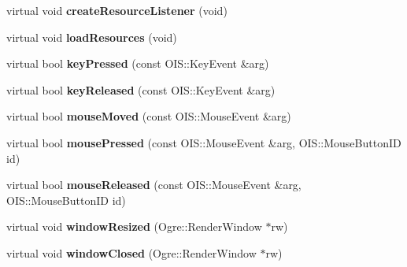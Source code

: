 \begin{DoxyCompactItemize}
\item 
\hypertarget{classBaseApplication_a9b77972f0f747a61e1f8ceba2ad47641}{virtual void {\bfseries create\-Resource\-Listener} (void)}\label{classBaseApplication_a9b77972f0f747a61e1f8ceba2ad47641}

\item 
\hypertarget{classBaseApplication_aaeb764e637dd87601a81a80156659d88}{virtual void {\bfseries load\-Resources} (void)}\label{classBaseApplication_aaeb764e637dd87601a81a80156659d88}

\item 
\hypertarget{classBaseApplication_acfa977f04e435f18018ece805c1277ec}{virtual bool {\bfseries key\-Pressed} (const O\-I\-S\-::\-Key\-Event \&arg)}\label{classBaseApplication_acfa977f04e435f18018ece805c1277ec}

\item 
\hypertarget{classBaseApplication_aba5c7c9dea7a0efc58b89310bae547e5}{virtual bool {\bfseries key\-Released} (const O\-I\-S\-::\-Key\-Event \&arg)}\label{classBaseApplication_aba5c7c9dea7a0efc58b89310bae547e5}

\item 
\hypertarget{classBaseApplication_a126e59cb246b061e51eb6ce06a2ee8f4}{virtual bool {\bfseries mouse\-Moved} (const O\-I\-S\-::\-Mouse\-Event \&arg)}\label{classBaseApplication_a126e59cb246b061e51eb6ce06a2ee8f4}

\item 
\hypertarget{classBaseApplication_a9255dfc1eabefd11c474ec45a6622504}{virtual bool {\bfseries mouse\-Pressed} (const O\-I\-S\-::\-Mouse\-Event \&arg, O\-I\-S\-::\-Mouse\-Button\-I\-D id)}\label{classBaseApplication_a9255dfc1eabefd11c474ec45a6622504}

\item 
\hypertarget{classBaseApplication_aa102c5859c14c0690c749994a446b53d}{virtual bool {\bfseries mouse\-Released} (const O\-I\-S\-::\-Mouse\-Event \&arg, O\-I\-S\-::\-Mouse\-Button\-I\-D id)}\label{classBaseApplication_aa102c5859c14c0690c749994a446b53d}

\item 
\hypertarget{classBaseApplication_afacf8a797588592ef0abbad593f10cfa}{virtual void {\bfseries window\-Resized} (Ogre\-::\-Render\-Window $\ast$rw)}\label{classBaseApplication_afacf8a797588592ef0abbad593f10cfa}

\item 
\hypertarget{classBaseApplication_ae0e37ac54a31ff6e51d58c7654ad1b90}{virtual void {\bfseries window\-Closed} (Ogre\-::\-Render\-Window $\ast$rw)}\label{classBaseApplication_ae0e37ac54a31ff6e51d58c7654ad1b90}

\end{DoxyCompactItemize}
